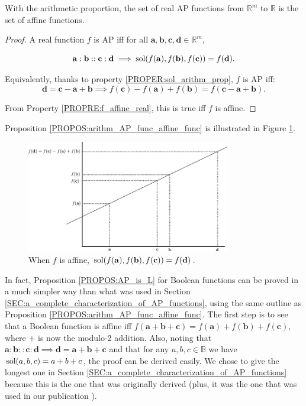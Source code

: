 \begin{proposition}
  \label{PROPOS:arithm_AP_func_affine_func}
  With the arithmetic proportion, the set of real AP functions from
  $\mathbb{R}^m$ to $\mathbb{R}$ is the set of affine functions.
\end{proposition}
\begin{proof}
  A real function $f$ is AP iff for all $\mathbf{a}, \mathbf{b}, \mathbf{c},
  \mathbf{d} \in \mathbb{R}^m$,

  $$\mathbf{a}: \mathbf{b}:: \mathbf{c}: \mathbf{d} \implies
  \text{sol}(f(\mathbf{a}), f(\mathbf{b}), f(\mathbf{c})) = f(\mathbf{d}).$$

  Equivalently, thanks to property \ref{PROPER:sol_arithm_prop},  $f$ is AP
  iff: $$\mathbf{d} = \mathbf{c} - \mathbf{a} + \mathbf{b} \implies
  f(\mathbf{c}) - f(\mathbf{a}) +  f(\mathbf{b}) = f( \mathbf{c} - \mathbf{a} +
  \mathbf{b}).$$

  From Property \ref{PROPRE:f_affine_real}, this is true iff $f$ is affine.
\end{proof}

Proposition \ref{PROPOS:arithm_AP_func_affine_func} is illustrated in Figure
\ref{FIG:real_AP_func}.
\begin{figure}[!h]
\centering
  \includegraphics[width=3.5in]{figures/real_AP_fuction.pdf}
  \caption{When $f$ is affine, $\text{sol}(f(\mathbf{a}), f(\mathbf{b}),
  f(\mathbf{c})) = f(\mathbf{d})$.}
\label{FIG:real_AP_func}
\end{figure}

In fact, Proposition \ref{PROPOS:AP_is_L} for Boolean functions can be
proved in a much simpler way than what was used in Section
\ref{SEC:a_complete_characterization_of_AP_functions}, using
the same outline as Proposition \ref{PROPOS:arithm_AP_func_affine_func}. The
first step is to see that a Boolean function is affine iff $f(\mathbf{a} +
\mathbf{b} + \mathbf{c}) = f(\mathbf{a}) + f(\mathbf{b}) + f(\mathbf{c})$,
where $+$ is now the modulo-2 addition. Also, noting that $\mathbf{a} :
\mathbf{b} :: \mathbf{c} : \mathbf{d} \implies \mathbf{d} = \mathbf{a} +
\mathbf{b} + \mathbf{c}$ and that for any $a, b, c \in \mathbb{B}$ we have
$\text{sol}(a, b, c) = a + b + c$, the proof can be derived easily. We chose to give
the longest one in Section
\ref{SEC:a_complete_characterization_of_AP_functions} because this is the one
that was originally derived (plus, it was the one that was used in our
publication \cite{CouHugPraRicIJCAI17}).

